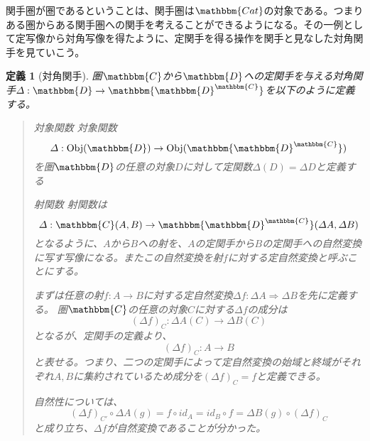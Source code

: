 \documentclass[uplatex,dvipdfmx]{jsarticle}
\newcommand{\cat}[1]{\mathbbm{#1}}
\newcommand{\arrow}{\rightarrow}
\newcommand{\functor}[3]{#1:\cat{#2}\arrow \cat{#3}}
\newcommand{\nat}[3]{#1:#2\Rightarrow #3}
\newcommand{\obj}[1]{\mathrm{Obj}(\cat{#1})}
\newcommand{\mor}[3]{#1:#2\arrow #3}
\newcommand{\arset}[3]{\cat{#1}(#2,#3)}
\newcommand{\funccat}[2]{\cat{#2}^\cat{#1}}
\newtheorem{define}[proof]{定義}
\numberwithin{proof}{subsection}
\newenvironment{mydescription}
{\begin{description}
  \setlength{\parskip}{0.5cm}
}
{\end{description}}
\begin{document}
  関手圏が圏であるということは、関手圏は$\cat{Cat}$の対象である。つまりある圏からある関手圏への関手を考えることができるようになる。その一例として定写像から対角写像を得たように、定関手を得る操作を関手と見なした対角関手を見ていこう。\\
  \begin{define}[対角関手]
    圏$\cat{C}$から$\cat{D}$への定関手を与える対角関手$\functor{\varDelta}{D}{\funccat{C}{D}}$を以下のように定義する。
    \begin{quote}
			\begin{mydescription}
				\item[対象関数] 対象関数\[\mor{\varDelta}{\obj{D}}{\obj{\funccat{C}{D}}}\]
				を圏$\cat{D}$の任意の対象$D$に対して定関数$\varDelta(D)=\varDelta D$と定義する 
				\item[射関数] 
        射関数は\[\mor{\varDelta}{\arset{C}{A}{B}}{\arset{\funccat{C}{D}}{\varDelta A}{\varDelta B}}\]となるように、$A$から$B$への射を、$A$の定関手から$B$の定関手への自然変換に写す写像になる。またこの自然変換を射$f$に対する定自然変換と呼ぶことにする。

        まずは任意の射$\mor{f}{A}{B}$に対する定自然変換$\nat{\varDelta f}{\varDelta A}{\varDelta B}$を先に定義する。
        圏$\cat{C}$の任意の対象$C$に対する$\varDelta f$の成分は\[\mor{(\varDelta f)_C}{\varDelta A(C)}{\varDelta B(C)}\]となるが、定関手の定義より、\[\mor{(\varDelta f)_C}{A}{B}\]と表せる。つまり、二つの定関手によって定自然変換の始域と終域がそれぞれ$A,B$に集約されているため成分を$(\varDelta f)_C=f$と定義できる。

        自然性については、\[(\varDelta f)_{C'}\circ\varDelta A(g)=f\circ id_A=id_B\circ f=\varDelta B(g)\circ(\varDelta f)_C\]と成り立ち、$\varDelta f$が自然変換であることが分かった。

        \begin{center}
\end{center}
\end{mydescription}
\end{quote}
\end{define}
\end{document}
